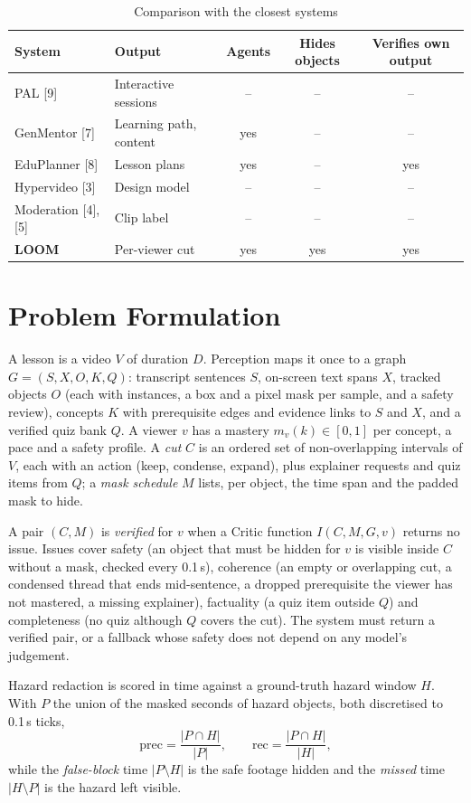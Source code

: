 \documentclass[9pt,a4paper]{extarticle}
\begin{document}
\begin{table}[t]
\caption{Comparison with the closest systems}
\label{tab:compare}
\centering
\begin{tabular}{|l|l|c|c|c|}
\hline
System & Output & Agents & Hides objects & Verifies own output\\
\hline
PAL [9] & Interactive sessions & -- & -- & --\\
GenMentor [7] & Learning path, content & yes & -- & --\\
EduPlanner [8] & Lesson plans & yes & -- & yes\\
Hypervideo [3] & Design model & -- & -- & --\\
Moderation [4], [5] & Clip label & -- & -- & --\\
\textbf{LOOM} & Per-viewer cut & yes & yes & yes\\
\hline
\end{tabular}
\end{table}

\section{Problem Formulation}
A lesson is a video $V$ of duration $D$. Perception maps it once to a graph $G=(S,X,O,K,Q)$: transcript sentences $S$,
on-screen text spans $X$, tracked objects $O$ (each with instances, a box and a pixel mask per sample, and a safety
review), concepts $K$ with prerequisite edges and evidence links to $S$ and $X$, and a verified quiz bank $Q$. A viewer
$v$ has a mastery $m_v(k)\in[0,1]$ per concept, a pace and a safety profile. A \emph{cut} $C$ is an ordered set of
non-overlapping intervals of $V$, each with an action (keep, condense, expand), plus explainer requests and quiz items
from $Q$; a \emph{mask schedule} $M$ lists, per object, the time span and the padded mask to hide.

A pair $(C,M)$ is \emph{verified} for $v$ when a Critic function $I(C,M,G,v)$ returns no issue. Issues cover safety (an
object that must be hidden for $v$ is visible inside $C$ without a mask, checked every 0.1\,s), coherence (an empty or
overlapping cut, a condensed thread that ends mid-sentence, a dropped prerequisite the viewer has not mastered, a
missing explainer), factuality (a quiz item outside $Q$) and completeness (no quiz although $Q$ covers the cut). The
system must return a verified pair, or a fallback whose safety does not depend on any model's judgement.

Hazard redaction is scored in time against a ground-truth hazard window $H$. With $P$ the union of the masked seconds of
hazard objects, both discretised to 0.1\,s ticks,
\begin{equation}
\mathrm{prec}=\frac{|P\cap H|}{|P|}, \qquad \mathrm{rec}=\frac{|P\cap H|}{|H|},
\end{equation}
while the \emph{false-block} time $|P\setminus H|$ is the safe footage hidden and the \emph{missed} time $|H\setminus P|$
is the hazard left visible.
\end{document}
